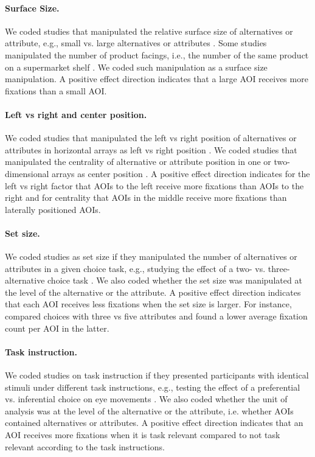 \paragraph{Surface Size.} We coded studies that manipulated the relative surface size of alternatives or attribute, e.g., small vs. large alternatives or attributes \citep{lohse1997a}. Some studies manipulated the number of product facings, i.e., the number of the same product on a supermarket shelf \citep{chandon2009a}. We coded such manipulation as a surface size manipulation. A positive effect direction indicates that a large AOI receives more fixations than a small AOI.

\paragraph{Left vs right and center position.} We coded studies that manipulated the left vs right position of alternatives or attributes in horizontal arrays as left vs right position \citep{kreplin2014a}. We coded studies that manipulated the centrality of alternative or attribute position in one or two-dimensional arrays as center position \citep[experiment 1A \& 1B in][]{atalay2012a,meissner2016a}. A positive effect direction indicates for the left vs right factor that AOIs to the left receive more fixations than AOIs to the right and for centrality that AOIs in the middle receive more fixations than laterally positioned AOIs.

\paragraph{Set size.} We coded studies as set size if they manipulated the number of alternatives or attributes in a given choice task, e.g., studying the effect of a two- vs. three-alternative choice task \citep{hong2016a}. We also coded whether the set size was manipulated at the level of the alternative or the attribute. A positive effect direction indicates that each AOI receives less fixations when the set size is larger. For instance, \cite{grebitus2015} compared choices with three vs five attributes and found a lower average fixation count per AOI in the latter.

\paragraph{Task instruction.} We coded studies on task instruction if they presented participants with identical stimuli under different task instructions, e.g., testing the effect of a preferential  vs. inferential choice on eye movements \citep{orquin2019a}. We also coded whether the unit of analysis was at the level of the alternative or the attribute, i.e. whether AOIs contained alternatives or attributes. A positive effect direction indicates that an AOI receives more fixations when it is task relevant compared to not task relevant according to the task instructions.

